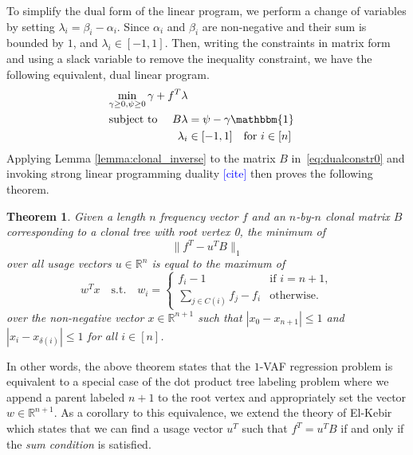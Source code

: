 \documentclass[10pt]{article}
\newtheorem{theorem}{Theorem}
\newcommand{\henri}[1]{\textcolor{blue}{[#1]}}
\begin{document}
To simplify the dual form of the linear program, we perform a change of variables by setting 
$\lambda_i = \beta_i - \alpha_i$. Since $\alpha_i$ and $\beta_i$ are non-negative and their sum 
is bounded by $1$, and $\lambda_i \in [-1, 1]$. Then, writing the constraints in matrix form and 
using a slack variable to remove the inequality constraint, we have
the following equivalent, dual linear program. 
\vspace{-0.5em}
\begin{align}
    \min_{\gamma \geq 0, \psi \geq 0} \gamma + f^T\lambda \nonumber \\
    \text{subject to } \quad 
    B\lambda &= \psi - \gamma\mathbbm{1} \label{eq:dualconstr0} \\
    \lambda_i &\in [-1, 1] \quad\text{for}\  i \in [n]
\end{align}
Applying Lemma \ref{lemma:clonal_inverse} to the matrix $B$ in~\eqref{eq:dualconstr0} and invoking
strong linear programming duality \henri{cite} then proves the following theorem.
\begin{theorem}
\label{thm:dptlp_equivalence}
  Given a length $n$ frequency vector $f$ and an $n$-by-$n$ clonal matrix $B$
  corresponding to a clonal tree with root vertex 0,
  the minimum of
  \[\lVert f^T - u^TB \rVert_1\]
  over all usage vectors $u \in \mathbb{R}^n$ is equal to the maximum of
  \[
      w^Tx \quad\text{s.t.}\quad
      w_i = \begin{cases}
          f_{i} - 1 &\text{if } i = n + 1,\\
          \sum_{j \in C(i)} f_j - f_{i} &\text{otherwise.}
    \end{cases}
  \]
  over the  non-negative vector $x \in \mathbb{R}^{n+1}$ such that 
  $|x_0 - x_{n + 1}| \leq 1$ and $|x_i - x_{\delta(i)}| \leq 1$ for all $i \in [n]$.
\end{theorem}

In other words, the above theorem states that the $1$-VAF regression problem is equivalent to a special 
case of the dot product tree labeling problem where we append a parent labeled $n + 1$ to the root vertex and appropriately
set the vector $w \in \mathbb{R}^{n + 1}$. As a corollary to this equivalence, we extend the 
theory of El-Kebir \cite{el-kebir_reconstruction_2015} which states that we can find a usage vector 
$u^T$ such that $f^T = u^TB$ if and only if the \emph{sum condition} \cite{el-kebir_reconstruction_2015} is 
satisfied.
\end{document}
